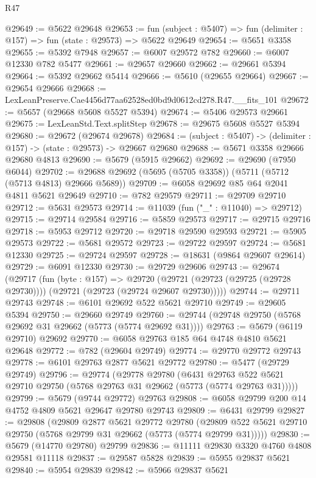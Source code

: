 \begin{lexlean}{R47}
\begin{coremodule}
@29649 := @5622 @29648
@29653 := fun (subject : @5407) => fun (delimiter : @157) => fun (state : @29573) => @5622 @29649
@29654 := @5651 @3358
@29655 := @5392 @7948
@29657 := @6007 @29572 @782
@29660 := @6007 @12330 @782 @5477
@29661 := @29657 @29660
@29662 := @29661 @5394
@29664 := @5392 @29662 @5414
@29666 := @5610 (@29655 @29664)
@29667 := @29654 @29666
@29668 := LexLeanPreserve.Cae4456d77aa62528ed0bd9d0612cd278.R47.__fits_101
@29672 := @5657 (@29668 @5608 @5527 @5394)
@29674 := @5406 @29573 @29661
@29675 := LexLeanStd.Text.splitStep
@29678 := @29675 @5608 @5527 @5394
@29680 := @29672 (@29674 @29678)
@29684 := (subject : @5407) -> (delimiter : @157) -> (state : @29573) -> @29667 @29680
@29688 := @5671 @3358 @29666 @29680 @4813
@29690 := @5679 (@5915 @29662)
@29692 := @29690 (@7950 @6044)
@29702 := @29688 @29692 (@5695 (@5705 @3358)) (@5711 (@5712 (@5713 @4813) @29666 @5689))
@29709 := @6058 @29692 @85 @64 @2041 @4811 @5621 @29649
@29710 := @782 @29579
@29711 := @29709 @29710
@29712 := @5631 @29573
@29714 := @11039 (fun ("_" : @11040) => @29712)
@29715 := @29714 @29584
@29716 := @5859 @29573
@29717 := @29715 @29716
@29718 := @5953 @29712
@29720 := @29718 @29590 @29593
@29721 := @5905 @29573
@29722 := @5681 @29572
@29723 := @29722 @29597
@29724 := @5681 @12330
@29725 := @29724 @29597
@29728 := @18631 (@9864 @29607 @29614)
@29729 := @6091 @12330
@29730 := @29729 @29606
@29743 := @29674
    (@29717
      (fun (byte : @157) =>
      @29720 (@29721 (@29723 (@29725 (@29728 @29730)))) (@29721 (@29723 (@29724 @29607 @29730)))))
@29744 := @29711 @29743
@29748 := @6101 @29692 @522 @5621 @29710
@29749 := @29605 @5394
@29750 := @29660 @29749
@29760 := @29744 (@29748 @29750 (@5768 @29692 @31 @29662 (@5773 (@5774 @29692 @31))))
@29763 := @5679 (@6119 @29710) @29692
@29770 := @6058 @29763 @185 @64 @4748 @4810 @5621 @29648
@29772 := @782 (@29604 @29749)
@29774 := @29770 @29772 @29743
@29778 := @6101 @29763 @2877 @5621 @29772
@29780 := @5477 (@29729 @29749)
@29796 := @29774
    (@29778
      @29780
      (@6431 @29763 @522 @5621 @29710 @29750 (@5768 @29763 @31 @29662 (@5773 (@5774 @29763 @31)))))
@29799 := @5679 (@9744 @29772) @29763
@29808 := @6058 @29799 @200 @14 @4752 @4809 @5621 @29647 @29780 @29743
@29809 := @6431 @29799
@29827 := @29808
    (@29809
      @2877
      @5621
      @29772
      @29780
      (@29809 @522 @5621 @29710 @29750 (@5768 @29799 @31 @29662 (@5773 (@5774 @29799 @31)))))
@29830 := @5679 (@14770 @29780) @29799
@29836 := @11111 @29830 @3320 @4760 @4808 @29581 @11118
@29837 := @29587 @5828
@29839 := @5955 @29837 @5621
@29840 := @5954 @29839
@29842 := @5966 @29837 @5621

\end{coremodule}
\end{lexlean}
